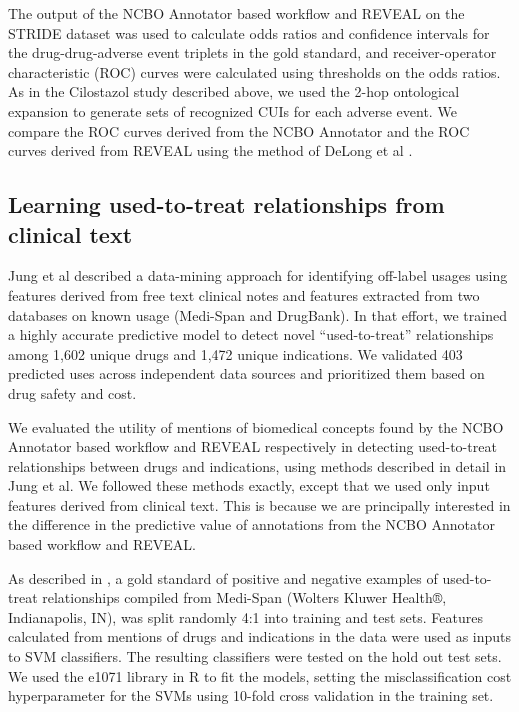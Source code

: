 The output of the NCBO Annotator based workflow and REVEAL on the
STRIDE dataset was used to calculate odds ratios and confidence
intervals for the drug-drug-adverse event triplets in the gold
standard, and receiver-operator characteristic (ROC) curves were
calculated using thresholds on the odds ratios.  As in the Cilostazol
study described above, we used the 2-hop ontological expansion to
generate sets of recognized CUIs for each adverse event.  We compare
the ROC curves derived from the NCBO Annotator and the ROC curves
derived from REVEAL using the method of DeLong et al
\cite{Delong1988}.

\subsection{Learning used-to-treat relationships from clinical text}
Jung et al \cite{Jung2014} described a data-mining approach for
identifying off-label usages using features derived from free text
clinical notes and features extracted from two databases on known
usage (Medi-Span and DrugBank). In that effort, we trained a highly
accurate predictive model to detect novel “used-to-treat”
relationships among 1,602 unique drugs and 1,472 unique
indications. We validated 403 predicted uses across independent data
sources and prioritized them based on drug safety and cost.

We evaluated the utility of mentions of biomedical concepts found by
the NCBO Annotator based workflow and REVEAL respectively in detecting
used-to-treat relationships between drugs and indications, using
methods described in detail in Jung et al. We followed these methods
exactly, except that we used only input features derived from clinical
text.  This is because we are principally interested in the difference
in the predictive value of annotations from the NCBO Annotator based
workflow and REVEAL.

As described in \cite{Platt2012}, a gold standard of positive and
negative examples of used-to-treat relationships compiled from
Medi-Span (Wolters Kluwer Health®, Indianapolis, IN), was split
randomly 4:1 into training and test sets.  Features calculated from
mentions of drugs and indications in the data were used as inputs to
SVM classifiers.  The resulting classifiers were tested on the hold
out test sets.  We used the e1071 library in R to fit the models,
setting the misclassification cost hyperparameter for the SVMs using
10-fold cross validation in the training set.


